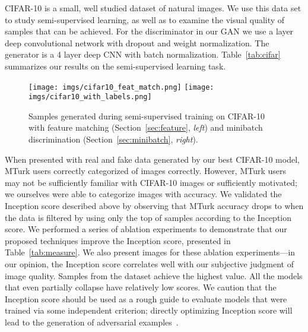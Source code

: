 \documentclass{article} \usepackage{nips14submit_e,times}
\newcommand{\tab}[1]{Table~\ref{tab:#1}}
\newcommand{\secc}[1]{Section~\ref{sec:#1}}
\begin{document}
CIFAR-10 is a small, well studied dataset of  natural images. We use this data set to study semi-supervised learning, as well as to examine the visual quality of samples that can be achieved. For the discriminator in our GAN we use a  layer deep convolutional network with dropout and weight normalization. The generator is a 4 layer deep CNN with batch normalization. \tab{cifar} summarizes our results on the semi-supervised learning task.



\begin{figure}
	\centering
	\texttt{[image: imgs/cifar10\_feat\_match.png]}
  \hfill
	\texttt{[image: imgs/cifar10\_with\_labels.png]}
	\caption{Samples generated during semi-supervised training on CIFAR-10 with feature matching (\secc{feature}, {\em left}) and minibatch discrimination (\secc{minibatch}, {\em right}).}
\label{fig:cifar10}
\end{figure}


When presented with  real and  fake data generated by our
best CIFAR-10 model, MTurk users correctly
categorized  of images correctly.
However, MTurk users may not be sufficiently familiar with CIFAR-10 images
or sufficiently motivated; we ourselves were able to categorize images
with  accuracy.
We validated the Inception score described above by observing that MTurk
accuracy drops to  when the data is filtered by using only the
top  of samples according to the Inception score.
We performed a series of ablation experiments to demonstrate that our proposed
techniques improve the Inception score, presented in \tab{measure}.
We also present images for these ablation experiments---in our opinion, the
Inception score correlates well with our subjective judgment of image quality.
Samples from the dataset achieve the
highest value.
All
the models that even partially collapse have relatively low scores.
We caution that the Inception score should be used as a rough guide to
evaluate models that were trained via some independent criterion; directly
optimizing Inception score will lead to the generation of
adversarial examples~\cite{szegedy2013intriguing}.
\end{document}
